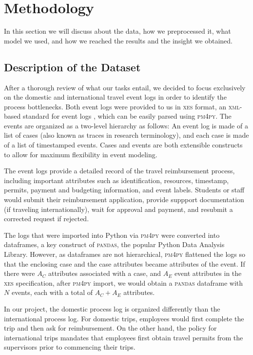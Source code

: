 \documentclass[conference]{IEEEtran}
\begin{document}
\section{Methodology}
\label{section-methodology}

In this section we will discuss about the data, 
how we preprocessed it, what model we used, and how
we reached the results and the insight we obtained.

\subsection{Description of the Dataset}

After a thorough review of what our tasks entail, we decided to focus
exclusively on the domestic and international travel event logs in order
to identify the process bottlenecks.  Both event logs
were provided to us in \textsc{xes} format,
an \textsc{xml}-based standard for event logs \cite{XES2021}, which can
be easily parsed using \textsc{pm4py}.
The events are organized as a two-level hierarchy as follows:
An event log is made of a list of cases
(also known as traces in research
terminology), and each case is made of a list of timestamped events. Cases and
events are both extensible constructs to allow for maximum flexibility in
event modeling.

The event logs provide a detailed record of the travel reimbursement process,
including important attributes such as identification, resources,
timestamp, permits, payment and budgeting information, and event labels.
Students or staff would submit their reimbursement application,
provide suppport documentation (if traveling internationally), wait for
approval and payment, and resubmit a corrected request if rejected.

The logs that were imported into Python via 
\textsc{pm4py} were converted into
dataframes, a key construct of
\textsc{pandas}, the popular Python Data Analysis Library. However, as
dataframes are not hierarchical, \textsc{pm4py} flattened the logs so that 
the enclosing case and the case attributes
became attributes of the event. If
there were $A_C$ attributes associated with a
case, and $A_E$ event attributes in the
\textsc{xes} specification, after \textsc{pm4py} import, we would obtain a
\textsc{pandas} dataframe 
with $N$ events, each with a total of $A_C + A_E$ attributes.

In our project,
the domestic process log is organized differently than
the international process log.  For domestic trips, employees would first
complete the trip and then ask for reimbursement. On the other hand,
the policy for international trips mandates that
employees first obtain travel permits from the supervisors prior to
commencing their trips.
\end{document}
